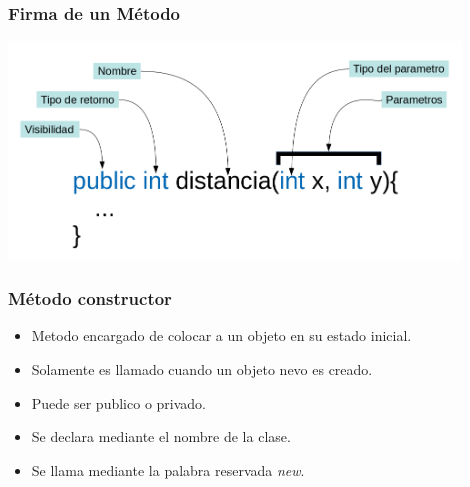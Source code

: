 \documentclass{beamer}
\begin{document}
\begin{frame}
\frametitle{Firma de un M\'etodo}
\includegraphics[width=12cm]{Firma.png}
\end{frame}

\begin{frame}
\frametitle{M\'etodo constructor}
\begin{itemize}
    \item Metodo encargado de colocar a un objeto en su estado inicial.
    \item Solamente es llamado cuando un objeto nevo es creado.
    \item Puede ser publico o privado.
    \item Se declara mediante el nombre de la clase.
    \item Se llama mediante la palabra reservada \emph{new}.
\end{itemize}
\end{frame}
\end{document}
